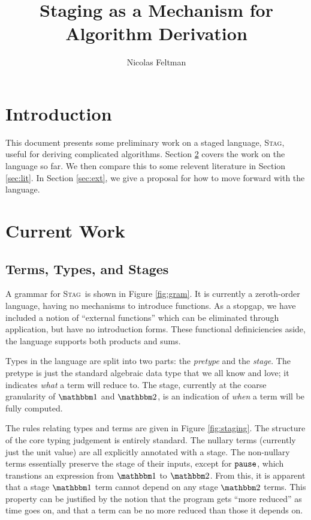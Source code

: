 \documentclass[11pt]{article}
\title{\Large\textbf{Staging as a Mechanism for Algorithm Derivation}}
\author{Nicolas Feltman}
\newcommand {\bbone} {\mathbbm 1}
\newcommand {\bbtwo} {\mathbbm 2}
\newcommand {\pause} {{\tt pause}}
\newcommand {\wstage} {\textsc{Stag}}
\begin{document}
\maketitle

\section{Introduction}

This document presents some preliminary work on a staged language, \wstage, useful for deriving complicated algorithms.  Section \ref{sec:current} covers the work on the language so far.  We then compare this to some relevent literature in Section \ref{sec:lit}.  In Section \ref{sec:ext}, we give a proposal for how to move forward with the language.

\section{Current Work}
\label{sec:current}

\subsection{Terms, Types, and Stages}
A grammar for \wstage~is shown in Figure \ref{fig:gram}.  It is currently a zeroth-order language, having no mechanisms to introduce functions.  As a stopgap, we have included a notion of ``external functions'' which can be eliminated through application, but have no introduction forms.  These functional definiciencies aside, the language supports both products and sums.

Types in the language are split into two parts: the {\it pretype} and the {\it stage}.  The pretype is just the standard algebraic data type that we all know and love; it indicates {\it what} a term will reduce to.  The stage, currently at the coarse granularity of $\bbone$ and $\bbtwo$, is an indication of {\it when} a term will be fully computed.

The rules relating types and terms are given in Figure \ref{fig:staging}.  The structure of the core typing judgement is entirely standard.  The nullary terms (currently just the unit value) are all explicitly annotated with a stage.  The non-nullary terms essentially preserve the stage of their inputs, except for $\pause$, which transtions an expression from $\bbone$ to $\bbtwo$.  From this, it is apparent that a stage $\bbone$ term cannot depend on any stage $\bbtwo$ terms.  This property can be justified by the notion that the program gets ``more reduced'' as time goes on, and that a term can be no more reduced than those it depends on.
\end{document}
